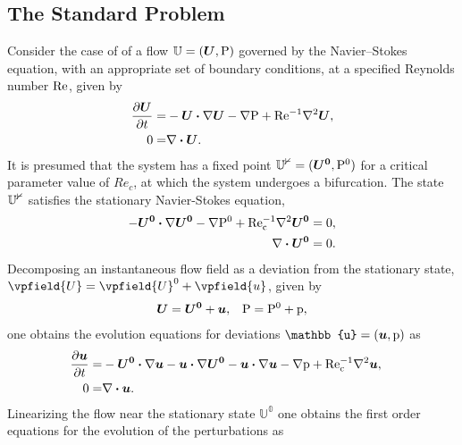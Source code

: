 \subsection{The Standard Problem}
Consider the case of of a flow $\mathbb{U} = (\boldsymbol{U},\mathrm{P})$ governed by the Navier--Stokes equation, with an appropriate set of boundary conditions, at a specified Reynolds number $\mathrm{Re}$, given by 
\begin{equation}
	\label{NavierStokes}
	\begin{aligned}
		\frac{\partial \boldsymbol{U}}{\partial t} =& - \boldsymbol{U}\boldsymbol{\cdot}\nabla \boldsymbol{U} - \nabla \mathrm{P} + \mathrm{Re^{-1}}\nabla^{2} \boldsymbol{U}, \\
		0 =& \nabla\boldsymbol{\cdot} \boldsymbol{U}.
	\end{aligned}
\end{equation}
It is presumed that the system has a fixed point $\mathbb{U^{0}} = (\boldsymbol{U^{0}},\mathrm{P^{0}})$ for a critical parameter value of $Re_{c}$, at which the system undergoes a bifurcation. The state $\mathbb{U^{0}}$ satisfies the stationary Navier-Stokes equation,
\begin{equation}
	\label{NS_stationary}
	\begin{aligned}
		-\boldsymbol{U^{0}}\boldsymbol{\cdot}\nabla \boldsymbol{U^{0}} - \nabla \mathrm{P^{0}} + \mathrm{Re_{c}^{-1}}\nabla^{2} \boldsymbol{U^{0}} = 0, \\
		\nabla\boldsymbol{\cdot} \boldsymbol{U^{0}}	= 0.
	\end{aligned}
\end{equation}
Decomposing an instantaneous flow field as a deviation from the stationary state, $\vpfield{U} = \vpfield{U}^{0} + \vpfield{u}$, given by
\begin{equation}
\begin{aligned}
	\label{flow_field_decomposition}
	\boldsymbol{U} 			   = \boldsymbol{U^{0}} + \boldsymbol{u}, && 
	\mathrm{P} 		= \mathrm{P^{0}} + \mathrm{p},
\end{aligned} \nonumber
\end{equation}
one obtains the evolution equations for deviations $\mathbb{u} = (\vecu,\pfield{p})$ as 
\begin{eqnarray}
	\label{NS_deviation}
	\begin{aligned}
		\frac{\partial \boldsymbol{u}}{\partial t} =& -\boldsymbol{U^{0}}\boldsymbol{\cdot}\nabla \boldsymbol{u} - \boldsymbol{u}\boldsymbol{\cdot}\nabla\boldsymbol{U^{0}} - \boldsymbol{u}\boldsymbol{\cdot}\nabla\boldsymbol{u} - \nabla \mathrm{p} + \mathrm{Re_{c}^{-1}}\nabla^{2}\boldsymbol{u},&& \\
		0 =& \nabla\boldsymbol{\cdot} \boldsymbol{u}. &&
	\end{aligned}
\end{eqnarray}
Linearizing the flow near the stationary state $\mathbb{U^{0}}$ one obtains the first order equations for the evolution of the perturbations as
